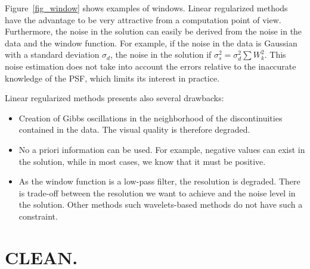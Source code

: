 \documentclass[11pt,a4paper]{article}
\begin{document}
Figure~\ref{fig_window} shows examples of windows.
Linear regularized methods have the advantage to be very attractive from
a computation point of view. Furthermore, the noise in the solution can
easily be derived from the noise in the data and the window function.
For example, if the noise in the data is Gaussian with a standard 
deviation $\sigma_d$,
the noise in the solution if $\sigma_s^2 = \sigma_d^2 \sum W_k^2$.
This noise estimation does not take into account the errors relative to 
the inaccurate knowledge of the PSF, which limits its interest in practice.

Linear regularized methods presents also several drawbacks:
\begin{itemize}
\item Creation of Gibbs oscillations in the neighborhood of 
 the discontinuities contained in the data. The visual quality is therefore
 degraded.
\item No a priori information can be used. For example, negative values
can exist in the solution, while in most cases, we
know that it must be positive.
\item As the window function is a low-pass filter, the resolution is degraded.
There is trade-off between the resolution we want to achieve and the noise
level in the solution. Other methods such wavelets-based methods do not
have such a constraint.
\end{itemize}


\section{CLEAN.}
\end{document}
